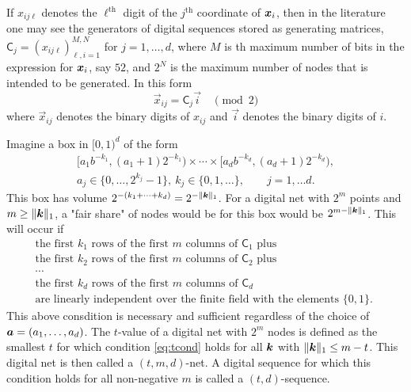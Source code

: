 \documentclass{svproc}
\begin{document}
If $x_{ij\ell}$ denotes the $\ell^{\text{th}}$ digit of the $j^{\text{th}}$ coordinate of ${\boldsymbol{x}}_i$, then in the literature one may see the generators of digital sequences stored as generating matrices, $\mathsf{C}_j = (x_{ij\ell})_{\ell,i = 1}^{M,N}$ for $j = 1, \ldots, d$, where $M$ is th maximum number of bits in the expression for ${\boldsymbol{x}}_i$, say $52$, and $2^N$ is the maximum number of nodes that is intended to be generated.  In this form
\begin{equation} \label{eq:digitalB}
	\overrightarrow{x}_{ij} = \mathsf{C}_j \overrightarrow{i} \quad \pmod{2}
\end{equation}
where $\overrightarrow{x}_{ij}$ denotes the binary digits of $x_{ij}$ and $\overrightarrow{i}$ denotes the binary digits of $i$.

Imagine a box in $[0,1)^d$ of the form
\begin{multline} \label{eq:element_box}
	[a_1 b^{-k_1}, (a_1 + 1) 2^{-k_1}) \times \cdots \times [a_d b^{-k_d}, (a_d + 1) 2^{-k_d}), \\
	a_j \in \{0, \ldots, 2^{k_j} - 1\}, \ k_j \in \{0,1, \ldots \}, \qquad j =1, \ldots d.
\end{multline}
This box has volume $2^{-(k_1 + \cdots +k_d)} = 2^{-\lVert{\boldsymbol{k}}\rVert_1}$.  For a digital net with $2^m$ points and $m \ge \lVert {\boldsymbol{k}} \rVert_1$, a "fair share" of nodes would be for this box would be $2^{m- \lVert {\boldsymbol{k}} \rVert_1}$.  This will occur if
\begin{multline} \label{eq:tcond}
	\text{the first $k_1$ rows of the first $m$ columns of $\mathsf{C}_1$ plus} \\
	\text{the first $k_2$ rows of the first $m$ columns of $\mathsf{C}_2$ plus} \\
	 \cdots \\
	\text{the first $k_d$ rows of the first $m$ columns of $\mathsf{C}_d$} \\
	\text{are linearly independent over the finite field with the elements $\{0,1\}$. }
\end{multline}
This above consdition is necessary and sufficient regardless of the choice of ${\boldsymbol{a}} = (a_1, \ldots, a_d)$.  The $t$-value of a digital net with $2^m$ nodes is defined as the smallest $t$ for which condition \eqref{eq:tcond} holds for all ${\boldsymbol{k}}$ with $\lVert {\boldsymbol{k}} \rVert_1 \le m-t$.  This digital net is then called a $(t,m,d)$-net.  A digital sequence for which this condition holds for all non-negative $m$ is called a  $(t,d)$-sequence.
\end{document}
